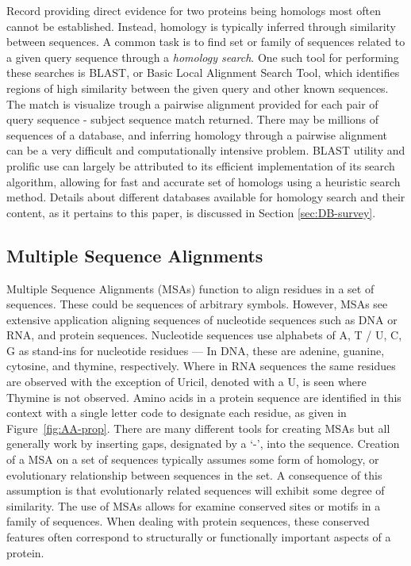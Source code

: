 Record providing direct evidence for two proteins being homologs most often cannot be established. Instead, homology is typically inferred through similarity between sequences. 
A common task is to find set or family of sequences related to a given query sequence through a \emph{homology search}. 
One such tool for performing these searches is BLAST, or Basic Local Alignment Search Tool, which identifies regions of high similarity between the given query and other known sequences. 
The match is visualize trough a pairwise alignment provided for each pair of query sequence - subject sequence match returned. 
There may be millions of sequences of a database, and inferring homology through a pairwise alignment can be a very difficult and computationally intensive problem. BLAST utility and prolific use can largely be attributed to its efficient implementation of its search algorithm, allowing for fast and accurate set of homologs using a heuristic search method. 
Details about different databases available for homology search and their content, as it pertains to this paper, is discussed in Section \ref{sec:DB-survey}.

\subsection{Multiple Sequence Alignments}
Multiple Sequence Alignments (MSAs) function to align residues in a set of sequences. These could be sequences of arbitrary symbols. However, MSAs see extensive application aligning sequences of nucleotide sequences such as DNA or RNA, and protein sequences.
Nucleotide sequences use alphabets of A, T / U, C, G as stand-ins for nucleotide residues --- In DNA, these are adenine, guanine, cytosine, and thymine, respectively. Where in RNA sequences the same residues are observed with the exception of Uricil, denoted with a U, is seen where Thymine is not observed.
 Amino acids in a protein sequence are identified in this context with a single letter code to designate each residue, as given in Figure~\ref{fig:AA-prop}.
There are many different tools for creating MSAs but all generally work by inserting gaps, designated by a `-', into the sequence. 
Creation of a MSA on a set of sequences typically assumes some form of homology, or evolutionary relationship between sequences in the set. 
A consequence of this assumption is that evolutionarly related sequences will exhibit some degree of similarity.
The use of MSAs allows for examine conserved sites or motifs in a family of sequences. When dealing with protein sequences, these conserved features often correspond to structurally or functionally important aspects of a protein.


